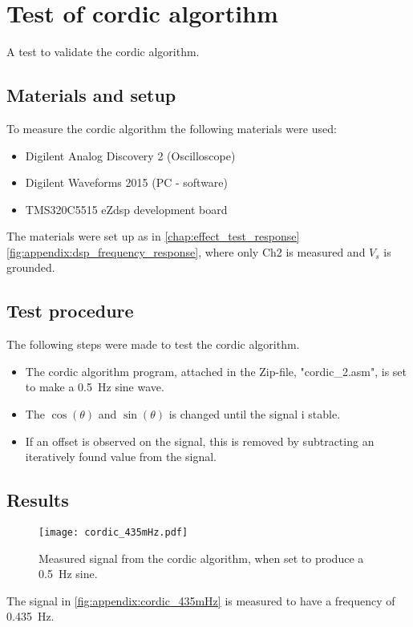 \chapter{Test of \gls{cordic} algortihm}\label{app:cordic_shape}
A test to validate the \gls{cordic} algorithm.

\section*{Materials and setup}
To measure the \gls{cordic} algorithm the following materials were used:
\begin{itemize}
\item Digilent Analog Discovery 2 (Oscilloscope)
\item Digilent Waveforms 2015 (PC - software)
\item TMS320C5515 eZdsp development board
\end{itemize}

The materials were set up as in \autoref{chap:effect_test_response} \autoref{fig:appendix:dsp_frequency_response}, where only Ch2 is measured and $V_s$ is grounded.

\section*{Test procedure}
The following steps were made to test the \gls{cordic} algorithm.
\begin{itemize}
\item The \gls{cordic} algorithm program, attached in the Zip-file, "cordic_2.asm", is set to make a \SI{0.5}{\hertz} sine wave.
\item The $\cos(\theta)$ and $\sin(\theta)$ is changed until the signal i stable.
\item If an offset is observed on the signal, this is removed by subtracting an iteratively found value from the signal.
\end{itemize} 

\section*{Results} 

\begin{figure}[htbp!]
	\centering
		\texttt{[image: cordic\_435mHz.pdf]}
		\caption{Measured signal from the \gls{cordic} algorithm, when set to produce a \SI{0.5}{\hertz} sine.}
		\label{fig:appendix:cordic_435mHz}
\end{figure}

The signal in \autoref{fig:appendix:cordic_435mHz} is measured to have a frequency of \SI{0.435}{\hertz}.